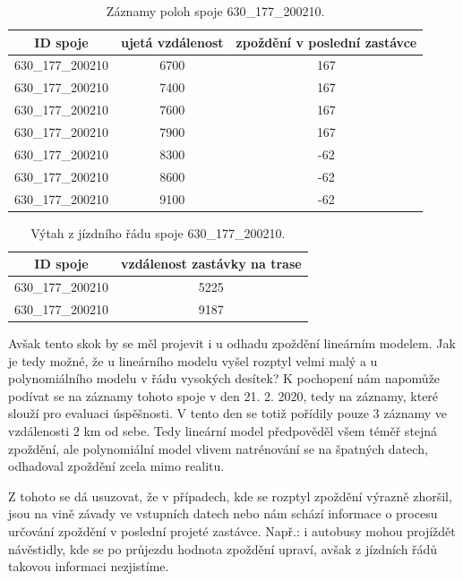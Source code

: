 \begin{center}
   \begin{table}[ht]
\centering
\begin{tabular}{|c|c|c|}
\hline
ID spoje & ujetá vzdálenost & zpoždění v poslední zastávce \\ \hline \hline
630\_177\_200210 & 6700 & 167 \\ \hline
630\_177\_200210 & 7400 & 167 \\ \hline
630\_177\_200210 & 7600 & 167 \\ \hline
630\_177\_200210 & 7900 & 167 \\ \hline
630\_177\_200210 & 8300 & -62 \\ \hline
630\_177\_200210 & 8600 & -62 \\ \hline
630\_177\_200210 & 9100 & -62 \\ \hline
\end{tabular}
\label{table:825_samples}
\caption{Záznamy poloh spoje 630\_177\_200210.}
\end{table}
\end{center}


\begin{center}
   \begin{table}[ht]
\centering
\begin{tabular}{|c|c|}
\hline
ID spoje & vzdálenost zastávky na trase \\ \hline \hline
630\_177\_200210 & 5225 \\ \hline
630\_177\_200210 & 9187 \\ \hline
\end{tabular}
\label{tab:825_ride}
\caption{Výtah z jízdního řádu spoje 630\_177\_200210.}
\end{table}
\end{center}


\bigbreak


Avšak tento skok by se měl projevit i u odhadu zpoždění lineárním modelem. Jak je tedy možné, že u lineárního modelu vyšel rozptyl velmi malý a u polynomiálního modelu v řádu vysokých desítek? K pochopení nám napomůže podívat se na záznamy tohoto spoje v den 21. 2. 2020, tedy na záznamy, které slouží pro evaluaci úspěšnosti. V tento den se totiž pořídily pouze 3 záznamy ve vzdálenosti 2 km od sebe. Tedy lineární model předpověděl všem téměř stejná zpoždění, ale polynomiální model vlivem natrénování se na špatných datech, odhadoval zpoždění zcela mimo realitu.


\bigbreak


Z tohoto se dá usuzovat, že v případech, kde se rozptyl zpoždění výrazně zhoršil, jsou na vině závady ve vstupních datech nebo nám schází informace o procesu určování zpoždění v poslední projeté zastávce. Např.: i autobusy mohou projíždět návěstidly, kde se po průjezdu hodnota zpoždění upraví, avšak z jízdních řádů takovou informaci nezjistíme.


